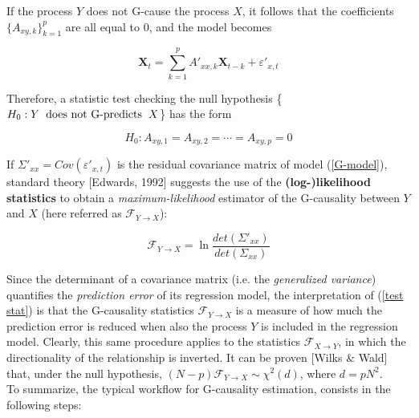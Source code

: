 \documentclass[12pt, a4paper]{article}
\begin{document}
If the process $Y$ does not G-cause the process $X$, it follows that the coefficients $\{A_{xy,k}\}_{k=1}^p $ are all equal to $0$, and the model becomes

\begin{equation}
\textbf{X}_t = \sum_{k=1}^{p} A'_{xx,k} \textbf{X}_{t-k} + \varepsilon'_{x,t} \label{G-model}
\end{equation}

Therefore, a statistic test checking  the null hypothesis \{$ H_0:  Y \hspace{0.2cm} \text{does not G-predicts} \hspace{0.2 cm} X $\} has the form

\begin{equation}
H_0: A_{xy,1} = A_{xy,2} = \cdots = A_{xy,p} = 0
\end{equation}


If  $\Sigma'_{xx} = Cov(\varepsilon'_{x,t}) $ is the residual covariance matrix of model (\ref{G-model}), standard theory [Edwards, 1992] suggests the use of the \textbf{(log-)likelihood statistics} to obtain a \textit{maximum-likelihood} estimator of the G-causality between $Y$ and $X$ (here referred as $ \mathcal{F}_{Y \rightarrow X} $):

\begin{equation}
\mathcal{F}_{Y \rightarrow X}  = \ln \frac{det(\Sigma'_{xx})}{det(\Sigma_{xx})} \label{test stat}
\end{equation}


Since the determinant of a covariance matrix (i.e. the \textit{generalized variance}) quantifies the \textit{prediction error} of its regression model, the interpretation of (\ref*{test stat}) is that the G-causality statistics  $ \mathcal{F}_{Y \rightarrow X} $ is a measure of how much the prediction error is reduced when also the process $Y$ is included in the regression model. Clearly, this same procedure applies to the statistics  $ \mathcal{F}_{X \rightarrow Y} $, in which the directionality of the relationship is inverted. It can be proven [Wilks \& Wald] that, under the null hypothesis, $ (N-p)\mathcal{F}_{Y \rightarrow X} \sim \chi^2(d)$, where $ d = pN^2$.
\\
To summarize, the typical workflow for G-causality estimation, consists in the following steps:
\end{document}
